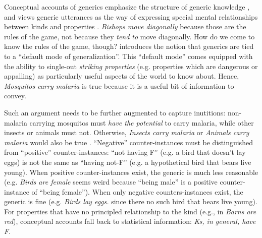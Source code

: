 \documentclass[12pt,letterpaper]{article}
\begin{document}
Conceptual accounts of generics emphasize the structure of generic knowledge \cite{Prasada2000}, and views generic utterances as the way of expressing special mental relationships between kinds and properties \cite{Leslie2008, Prasada2012}.
\emph{Bishops move diagonally} because those are the rules of the game, not because they \emph{tend to} move diagonally.
How do we come to know the rules of the game, though?
 introduces the notion that generics are tied to a ``default mode of generalization''. 
This ``default mode'' comes equipped with the ability to single-out \emph{striking properties} (e.g. properties which are dangerous or appalling) as particularly useful aspects of the world to know about. 
Hence, \emph{Mosquitos carry malaria} is true because it is a useful bit of information to convey.

Such an argument needs to be further augmented to capture inutitions: non-malaria carrying mosquitos must \emph{have the potential} to carry malaria, while other insects or animals must not. Otherwise, \emph{Insects carry malaria} or \emph{Animals carry malaria} would also be true \cite{Leslie2007}.
``Negative'' counter-instances must be distinguished from ``positive'' counter-instances: ``not having F'' (e.g. a bird that doesn't lay eggs) is not the same as ``having not-F'' (e.g. a hypothetical bird that bears live young).
When positive counter-instances exist, the generic is much less reasonable (e.g. \emph{Birds are female} seems weird because ``being male'' is a positive counter-instance of ``being female''). 
When only negative counters-instances exist, the generic is fine (e.g. \emph{Birds lay eggs.} since there no such bird that bears live young).
For properties that have no principled relationship to the kind (e.g., in \emph{Barns are red}), conceptual accounts fall back to statistical information: \emph{Ks, in general, have F}.
\end{document}

